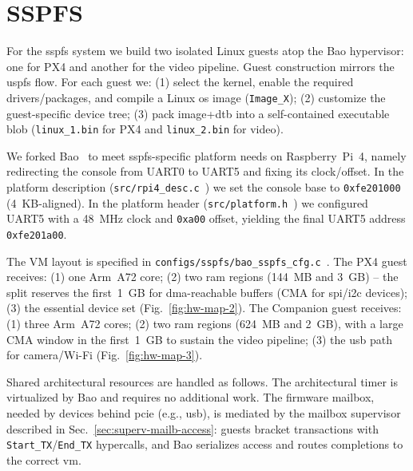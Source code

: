 \section{SSPFS}
\label{sec:sspfs-implem}
For the \gls{sspfs} system we build two isolated Linux guests atop the Bao
hypervisor: one for PX4 and another for the video pipeline. Guest construction
mirrors the \gls{uspfs} flow. For each guest we:
(1) select the kernel, enable the required drivers/packages, and compile a Linux
\gls{os} image (\lstinline{Image_X});
(2) customize the guest-specific device tree;
(3) pack image+\gls{dtb} into a self-contained executable blob
(\lstinline{linux_1.bin} for PX4 and \lstinline{linux_2.bin} for video).

We forked Bao~\cite{baoRepo-mine} to meet \gls{sspfs}-specific platform needs on
Raspberry~Pi~4, namely redirecting the console from UART0 to UART5 and fixing
its clock/offset. In the platform description
(\lstinline{src/rpi4_desc.c}~\cite{thesis-sw-github}) we set the console base to
\lstinline{0xfe201000} (4~KB-aligned). In the platform header
(\lstinline{src/platform.h}~\cite{thesis-sw-github}) we configured UART5 with a
48~MHz clock and \lstinline{0xa00} offset, yielding the final UART5 address
\lstinline{0xfe201a00}.

The VM layout is specified in
\lstinline{configs/sspfs/bao_sspfs_cfg.c}~\cite{thesis-sw-github}. The PX4
guest receives:
(1) one Arm~A72 core;
(2) two \gls{ram} regions (144~MB and 3~GB) -- the split reserves the first~1~GB
for \gls{dma}-reachable buffers (CMA for \gls{spi}/\gls{i2c} devices);
(3) the essential device set (Fig.~\ref{fig:hw-map-2}).
The Companion guest receives:
(1) three Arm~A72 cores;
(2) two \gls{ram} regions (624~MB and 2~GB), with a large CMA window in the
first~1~GB to sustain the video pipeline;
(3) the \gls{usb} path for camera/Wi-Fi (Fig.~\ref{fig:hw-map-3}).

Shared architectural resources are handled as follows. The architectural timer is
virtualized by Bao and requires no additional work. The firmware mailbox, needed
by devices behind \gls{pcie} (e.g., \gls{usb}), is mediated by the mailbox
supervisor described in Sec.~\ref{sec:superv-mailb-access}: guests bracket
transactions with \lstinline{Start_TX}/\lstinline{End_TX} hypercalls, and Bao
serializes access and routes completions to the correct \gls{vm}.

